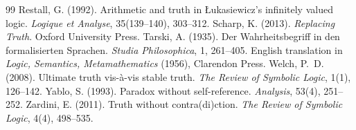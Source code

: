 \documentclass{situationist-preprint}
\begin{document}
\begin{thebibliography}{99}
 Restall, G. (1992). Arithmetic and truth in Łukasiewicz's infinitely valued logic. \emph{Logique et Analyse}, 35(139--140), 303--312.
 Scharp, K. (2013). \emph{Replacing Truth}. Oxford University Press.
 Tarski, A. (1935). Der Wahrheitsbegriff in den formalisierten Sprachen. \emph{Studia Philosophica}, 1, 261--405. English translation in \emph{Logic, Semantics, Metamathematics} (1956), Clarendon Press.
 Welch, P.~D. (2008). Ultimate truth vis-à-vis stable truth. \emph{The Review of Symbolic Logic}, 1(1), 126--142.
 Yablo, S. (1993). Paradox without self-reference. \emph{Analysis}, 53(4), 251--252.
 Zardini, E. (2011). Truth without contra(di)ction. \emph{The Review of Symbolic Logic}, 4(4), 498--535.
\end{thebibliography}
\end{document}
